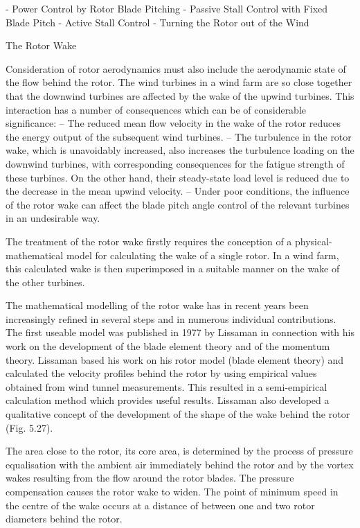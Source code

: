 - Power Control by Rotor Blade Pitching
- Passive Stall Control with Fixed Blade Pitch
- Active Stall Control
- Turning the Rotor out of the Wind

The Rotor Wake

Consideration of rotor aerodynamics must also include the aerodynamic state of the flow behind the rotor. The wind turbines in a wind farm are so close together that the downwind turbines are affected by the wake of the upwind turbines. This interaction has a number of consequences which can be of considerable significance:
– The reduced mean flow velocity in the wake of the rotor reduces the energy output of the subsequent wind turbines.
– The turbulence in the rotor wake, which is unavoidably increased, also increases the turbulence loading on the downwind turbines, with corresponding consequences for the fatigue strength of these turbines. On the other hand, their steady-state load level is reduced due to the decrease in the mean upwind velocity.
– Under poor conditions, the influence of the rotor wake can affect the blade pitch angle control of the relevant turbines in an undesirable way.

The treatment of the rotor wake firstly requires the conception of a physical-mathematical model for calculating the wake of a single rotor. In a wind farm, this calculated wake is then superimposed in a suitable manner on the wake of the other turbines.

The mathematical modelling of the rotor wake has in recent years been increasingly refined in several steps and in numerous individual contributions. The first useable model was published in 1977 by Lissaman in connection with his work on the development of the blade element theory and of the momentum theory. Lissaman based his work on his rotor model (blade element theory) and calculated the velocity profiles behind the rotor by using empirical values obtained from wind tunnel measurements. This resulted
in a semi-empirical calculation method which provides useful results. Lissaman also developed a qualitative concept of the development of the shape of the wake behind the rotor (Fig. 5.27).

The area close to the rotor, its core area, is determined by the process of pressure equalisation with the ambient air immediately behind the rotor and by the vortex wakes resulting from the flow around the rotor blades. The pressure compensation causes the rotor wake to widen. The point of minimum speed in the centre of the wake occurs at a distance of between one and two rotor diameters behind the rotor.

